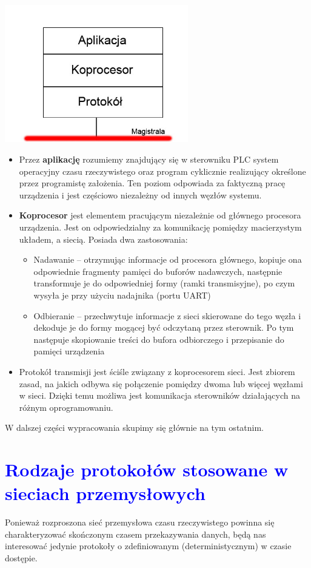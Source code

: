 \documentclass[a4paper,twoside]{article}
\begin{document}
\begin{center}
	\includegraphics[width=8cm]{./img/wezel.jpg}
\end{center}

\begin{itemize}
	\item Przez \textbf{aplikację} rozumiemy znajdujący się w sterowniku PLC system operacyjny czasu rzeczywistego oraz program cyklicznie realizujący określone przez programistę założenia. Ten poziom odpowiada za faktyczną pracę urządzenia i jest częściowo niezależny od innych węzłów systemu. \\
	\item \textbf{Koprocesor} jest elementem pracującym niezależnie od głównego procesora urządzenia. Jest on odpowiedzialny za komunikację pomiędzy macierzystym układem, a siecią. Posiada dwa zastosowania: 
	\begin{itemize}
		\item Nadawanie – otrzymując informacje od procesora głównego,  kopiuje ona odpowiednie fragmenty pamięci do buforów nadawczych, następnie transformuje je do odpowiedniej formy (ramki transmisyjne), po czym wysyła je przy użyciu nadajnika (portu UART) \\
		\item Odbieranie – przechwytuje informacje z sieci skierowane do tego węzła i dekoduje je do formy mogącej być odczytaną przez sterownik. Po tym następuje skopiowanie treści do bufora odbiorczego i przepisanie do pamięci urządzenia 
	\end{itemize}
	\item Protokół transmisji jest ściśle związany z koprocesorem sieci. Jest zbiorem zasad, na jakich odbywa się połączenie pomiędzy dwoma lub więcej węzłami w sieci. Dzięki temu możliwa jest komunikacja sterowników działających na różnym oprogramowaniu. \\
	
\end{itemize}

W dalszej części wypracowania skupimy się głównie na tym ostatnim.


\section{\textcolor{blue}{Rodzaje protokołów stosowane w sieciach przemysłowych}}

Ponieważ rozproszona sieć przemysłowa czasu rzeczywistego powinna się charakteryzować  skończonym czasem przekazywania danych, będą nas interesować jedynie protokoły o zdefiniowanym (deterministycznym) w czasie dostępie. 
\end{document}
